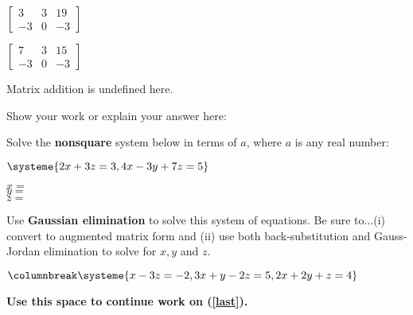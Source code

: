 \documentclass{exam}
\begin{document}
\begin{questions}
\begin{multicols}{2}
\begin{choices}
\choice 
$
\begin{bmatrix}
3 & 3 & 19\\
-3 & 0 & -3
\end{bmatrix}
$

\choice 
$
\begin{bmatrix}
7 & 3 & 15\\
-3 & 0 & -3
\end{bmatrix}
$

\choice Matrix addition is undefined here.
\end{choices}

\columnbreak
Show your work or explain your answer here:

\end{multicols}

\newpage


\question



\begin{multicols}{2}
Solve the \textbf{nonsquare} system below in terms of $a$, where $a$ is any real number:

$
\systeme{
2x + 3z = 3,
4x - 3y    + 7z = 5
}
$
\columnbreak


\hspace{2cm}$x = $ \fillin \\

\hspace{2cm}$y = $ \fillin \\

\hspace{2cm}$z = $ \fillin \\
\end{multicols}
\makeemptybox{3in}


\question
\label{last}
\begin{multicols}{2}
Use \textbf{Gaussian elimination} to solve this system of equations.  Be sure to...(i) convert to augmented matrix form and (ii) use both back-substitution and Gauss-Jordan elimination to solve for $x, y$ and $z$.


$
\columnbreak
\systeme{
x - 3z = -2,
3x + y    - 2z = 5,
2x + 2y + z = 4
}
$


\end{multicols}


\end{questions}

\newpage
\textbf{Use this space to continue work on (\ref{last}).}

\thispagestyle{empty}
\end{document}
